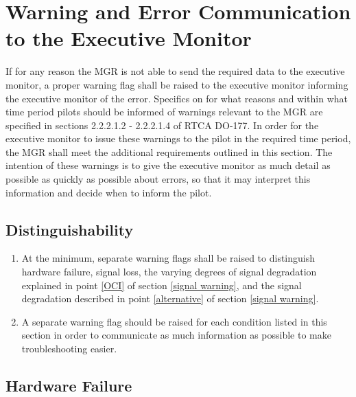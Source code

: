 \documentclass[11pt]{article}
\begin{document}
	\section{Warning and Error Communication to the Executive Monitor}
	If for any reason the MGR is not able to send the required data to the executive monitor, a proper warning flag shall be raised to the executive monitor informing the executive monitor of the error. Specifics on for what reasons and within what time period pilots should be informed of warnings relevant to the MGR are specified in sections 2.2.2.1.2 - 2.2.2.1.4 of RTCA DO-177. In order for the executive monitor to issue these warnings to the pilot in the required time period, the MGR shall meet the additional requirements outlined in this section. The intention of these warnings is to give the executive monitor as much detail as possible as quickly as possible about errors, so that it may interpret this information and decide when to inform the pilot.

		\subsection{Distinguishability}
			\begin{enumerate}

				\item At the minimum, separate warning flags shall be raised to distinguish hardware failure, signal loss, the varying degrees of signal degradation explained in point \ref{OCI} of section \ref{signal warning}, and the signal degradation described in point \ref{alternative} of section \ref{signal warning}.

				\item A separate warning flag should be raised for each condition listed in this section in order to communicate as much information as possible to make troubleshooting easier.

			\end{enumerate}

		\subsection{Hardware Failure}
\end{document}
